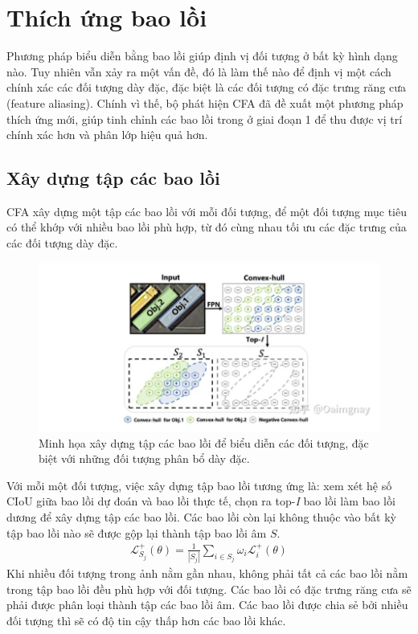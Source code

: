 \documentclass[12pt,a4paper,openany,oneside]{report}
\begin{document}
\section{Thích ứng bao lồi}
Phương pháp biểu diễn bằng bao lồi giúp định vị đối tượng ở bất kỳ hình dạng nào. Tuy nhiên vẫn xảy ra một vấn đề, đó là làm thế nào để định vị một cách chính xác các đối tượng dày đặc, đặc biệt là các đối tượng có đặc trưng răng cưa (feature aliasing). Chính vì thế, bộ phát hiện CFA đã đề xuất một phương pháp thích ứng mới, giúp tinh chỉnh các bao lồi trong ở giai đoạn 1 để thu được vị trí chính xác hơn và phân lớp hiệu quả hơn.
\subsection{Xây dựng tập các bao lồi}
CFA xây dựng một tập các bao lồi với mỗi đối tượng, để một đối tượng mục tiêu có thể khớp với nhiều bao lồi phù hợp, từ đó cùng nhau tối ưu các đặc trưng của các đối tượng dày đặc.

\begin{figure}[ht!]
	\begin{center}
		\includegraphics[width=445px]{./construction_convex_hull_set.jpg}
		\caption{Minh họa xây dựng tập các bao lồi để biểu diễn các đối tượng, đặc biệt với những đối tượng phân bổ dày đặc.}
		\label{fig_dhandang1}
	\end{center}
\end{figure} 
Với mỗi một đối tượng, việc xây dựng tập bao lồi tương ứng là: xem xét hệ số CIoU giữa bao lồi dự đoán và bao lồi thực tế, chọn ra top-\textit{I} bao lồi làm bao lồi dương để xây dựng tập các bao lồi. Các bao lồi còn lại không thuộc vào bất kỳ tập bao lồi nào sẽ được gộp lại thành tập bao lồi âm $S$.
\begin{align} \label{construct_convex_hull_set}
\mathcal{L}_{S_j}^{+}(\theta)=\frac{1}{\left|S_j\right|} \sum_{i \in S_j} \omega_i \mathcal{L}_i^{+}(\theta)
\end{align}
Khi nhiều đối tượng trong ảnh nằm gần nhau, không phải tất cả các bao lồi nằm trong tập bao lồi đều phù hợp với đối tượng. Các bao lồi có đặc trưng răng cưa sẽ phải được phân loại thành tập các bao lồi âm. Các bao lồi được chia sẻ bởi nhiều đối tượng thì sẽ có độ tin cậy thấp hơn các bao lồi khác.
\end{document}
